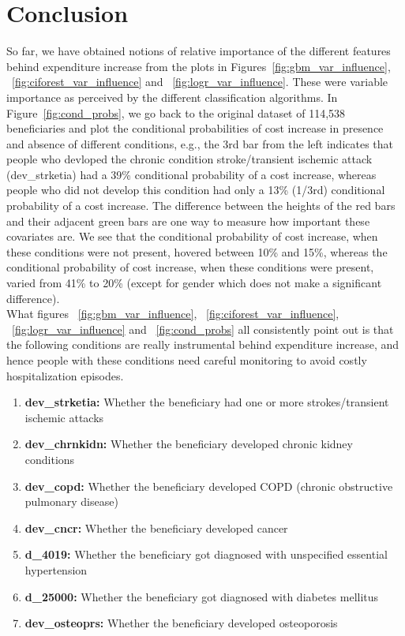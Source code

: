 \section{Conclusion}
\label{sec:concl}
So far, we have obtained notions of relative importance of the different features behind expenditure increase from the plots in Figures~\ref{fig:gbm_var_influence}, ~\ref{fig:ciforest_var_influence} and ~\ref{fig:logr_var_influence}. These were variable importance as perceived by the different classification algorithms. In Figure~\ref{fig:cond_probs}, we go back to the original dataset of 114,538 beneficiaries and plot the conditional probabilities of cost increase in presence and absence of different conditions, e.g., the 3rd bar from the left indicates that people who devloped the chronic condition stroke/transient ischemic attack (dev\_strketia) had a 39\% conditional probability of a cost increase, whereas people who did not develop this condition had only a 13\% (1/3rd) conditional probability of a cost increase. The difference between the heights of the red bars and their adjacent green bars are one way to measure how important these covariates are. We see that the conditional probability of cost increase, when these conditions were not present, hovered between 10\% and 15\%, whereas the conditional probability of cost increase, when these conditions were present, varied from 41\% to 20\% (except for gender which does not make a significant difference).\\

What figures ~\ref{fig:gbm_var_influence}, ~\ref{fig:ciforest_var_influence}, ~\ref{fig:logr_var_influence} and ~\ref{fig:cond_probs} all consistently point out is that the following conditions are really instrumental behind expenditure increase, and hence people with these conditions need careful monitoring to avoid costly hospitalization episodes.
\begin{enumerate}
\item {\bf dev\_strketia:} Whether the beneficiary had one or more strokes/transient ischemic attacks
\item {\bf dev\_chrnkidn:} Whether the beneficiary developed chronic kidney conditions
\item {\bf dev\_copd:} Whether the beneficiary developed COPD (chronic obstructive pulmonary disease)
\item {\bf dev\_cncr:} Whether the beneficiary developed cancer
\item {\bf d\_4019:} Whether the beneficiary got diagnosed with unspecified essential hypertension
\item {\bf d\_25000:} Whether the beneficiary got diagnosed with diabetes mellitus
\item {\bf dev\_osteoprs:} Whether the beneficiary developed osteoporosis
\end{enumerate}

